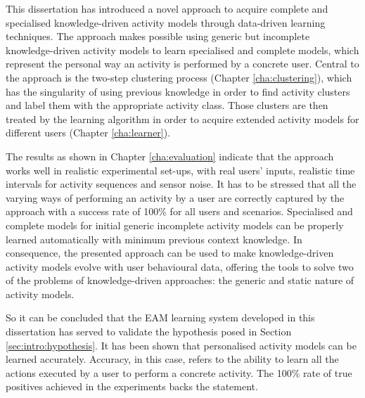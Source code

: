 This dissertation has introduced a novel approach to acquire complete and specialised knowledge-driven activity models through data-driven learning techniques. The approach makes possible using generic but incomplete knowledge-driven activity models to learn specialised and complete models, which represent the personal way an activity is performed by a concrete user. Central to the approach is the two-step clustering process (Chapter \ref{cha:clustering}), which has the singularity of using previous knowledge in order to find activity clusters and label them with the appropriate activity class. Those clusters are then treated by the learning algorithm in order to acquire extended activity models for different users (Chapter \ref{cha:learner}).

The results as shown in Chapter \ref{cha:evaluation} indicate that the approach works well in realistic experimental set-ups, with real users' inputs, realistic time intervals for activity sequences and sensor noise. It has to be stressed that all the varying ways of performing an activity by a user are correctly captured by the approach with a success rate of 100\% for all users and scenarios. Specialised and complete models for initial generic incomplete activity models can be properly learned automatically with minimum previous context knowledge. In consequence, the presented approach can be used to make knowledge-driven activity models evolve with user behavioural data, offering the tools to solve two of the problems of knowledge-driven approaches: the generic and static nature of activity models.

So it can be concluded that the EAM learning system developed in this dissertation has served to validate the hypothesis posed in Section \ref{sec:intro:hypothesis}. It has been shown that personalised activity models can be learned accurately. Accuracy, in this case, refers to the ability to learn all the actions executed by a user to perform a concrete activity. The 100\% rate of true positives achieved in the experiments backs the statement.

